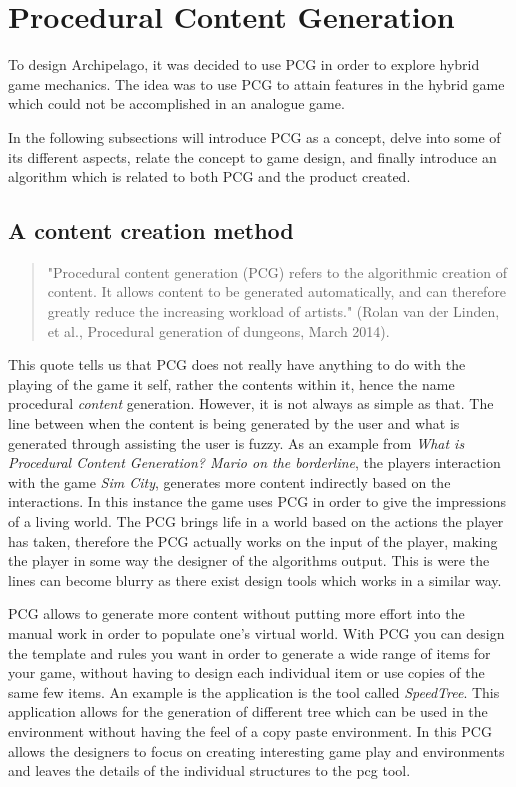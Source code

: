 \section{Procedural Content Generation}
To design Archipelago, it was decided to use PCG in order to explore hybrid game mechanics. The idea was to use PCG to attain features in the hybrid game which could not be accomplished in an analogue game.

In the following subsections will introduce PCG as a concept, delve into some of its different aspects, relate the concept to game design, and finally introduce an algorithm which is related to both PCG and the product created.

\subsection{A content creation method}
\begin{quotation}
"Procedural content generation (PCG) refers to the algorithmic creation of content. It allows content to be generated automatically, and can therefore greatly reduce the increasing workload of artists." (Rolan van der Linden, et al., Procedural generation of dungeons, March 2014). \cite{art:pcg}
\end{quotation}
This quote tells us that PCG does not really have anything to do with the playing of the game it self, rather the contents within it, hence the name procedural \textit{content} generation. 
However, it is not always as simple as that. The line between when the content is being generated by the user and what is generated through assisting the user is fuzzy.
As an example from \textit{What is Procedural Content Generation? Mario on the borderline}\cite{art:whatpcg}, the players interaction with the game \textit{Sim City}, generates more content indirectly based on the interactions.
In this instance the game uses PCG in order to give the impressions of a living world. The PCG brings life in a world based on the actions the player has taken, therefore the PCG actually works on the input of the player, making the player in some way the designer of the algorithms output. This is were the lines can become blurry as there exist design tools which works in a similar way. 

PCG allows to generate more content without putting more effort into the manual work in order to populate one's virtual world. With PCG you can design the template and rules you want in order to generate a wide range of items for your game, without having to design each individual item or use copies of the same few items. An example is the application is the tool called \textit{SpeedTree}. This application allows for the generation of different tree which can be used in the environment without having the feel of a copy paste environment. In this PCG allows the designers to focus on creating interesting game play and environments and leaves the details of the individual structures to the pcg tool. 

